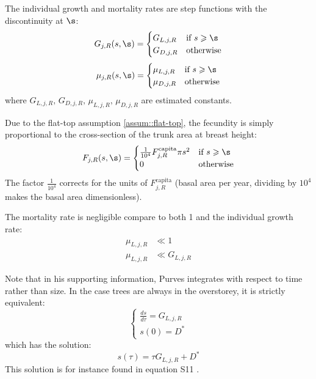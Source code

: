 \begin{refsection}
\begin{assum}
	The individual growth and mortality rates are step functions with the discontinuity at $ \s $:
	\[
		G_{j, R}(s, \s) =
		\begin{cases}
			G_{L, j, R} & \text{if } s \geqslant \s \\
			G_{D, j, R} & \text{otherwise}
		\end{cases}
	\]
	\[
	\mu_{j, R}(s, \s) =
		\begin{cases}
			\mu_{L, j, R} & \text{if } s \geqslant \s \\
			\mu_{D, j, R} & \text{otherwise}
		\end{cases}
	\]
	where $ G_{L, j, R}, \, G_{D, j, R}, \, \mu_{L, j, R}, \, \mu_{D, j, R} $ are estimated constants.
\end{assum}

\begin{assum}
	Due to the flat-top assumption \ref{assum::flat-top}, the fecundity is simply proportional to the cross-section of the trunk area at breast height:
	\[
		F_{j, R} (s, \s) =
		\begin{cases}
			\frac{1}{10^4} F_{j, R}^{\text{capita}} \pi s^2 & \text{if } s \geqslant \s \\
			0 & \text{otherwise}
		\end{cases}
	\]
	The factor $ \frac{1}{10^4} $ corrects for the units of $ F_{j, R}^{\text{capita}} $ (basal area per year, dividing by $ 10^4 $ makes the basal area dimensionless).
\end{assum}

\begin{assum} \label{assum::negligible}
	The mortality rate is negligible compare to both 1 and the individual growth rate:
	\begin{align}
		\mu_{L, j, R} &\ll 1 \\
		\mu_{L, j, R} &\ll G_{L, j, R}
	\end{align}
\end{assum}

Note that in his supporting information, Purves integrates with respect to time rather than size. In the case trees are always in the overstorey, it is strictly equivalent:
\[
	\begin{cases}
		\frac{ds}{d \tau} = G_{L, j, R} \\
		s(0) = D^{*}
	\end{cases}
\]
which has the solution:
\[
	s(\tau) = \tau G_{L, j, R} + D^{*}
\]
This solution is for instance found in equation S11 \citep{Purves2009}.


\end{refsection}
